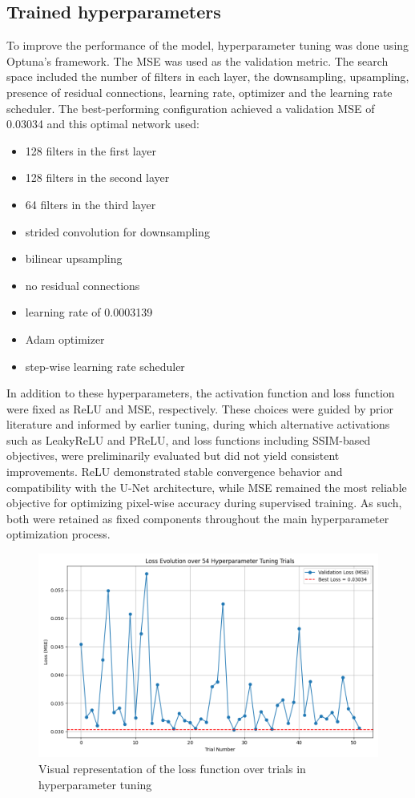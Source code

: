 \documentclass[twocolumn]{article}
\begin{document}
\subsection{Trained hyperparameters}
To improve the performance of the model, hyperparameter tuning was done using Optuna's framework. 
The MSE was used as the validation metric. The search space included the number of filters in each layer, the downsampling, upsampling, presence of residual connections, learning rate, optimizer and the learning rate scheduler. 
The best-performing configuration achieved a validation MSE of 0.03034 and this optimal network used: 
\begin{itemize}
    \item 128 filters in the first layer
    \item 128 filters in the second layer
    \item 64 filters in the third layer
    \item strided convolution for downsampling
    \item bilinear upsampling
    \item no residual connections
    \item learning rate of 0.0003139
    \item Adam optimizer 
    \item step-wise learning rate scheduler
\end{itemize}
In addition to these hyperparameters, the activation function and loss function were fixed as ReLU and MSE, respectively. 
These choices were guided by prior literature and informed by earlier tuning, during which alternative activations such as LeakyReLU and PReLU, and loss functions including SSIM-based objectives, were preliminarily evaluated but did not yield consistent improvements. 
ReLU demonstrated stable convergence behavior and compatibility with the U-Net architecture, while MSE remained the most reliable objective for optimizing pixel-wise accuracy during supervised training.
As such, both were retained as fixed components throughout the main hyperparameter optimization process. 

\begin{figure}[H]
    \centering
    \includegraphics[width=1\linewidth]{loss_hyperparameters.png}
    \caption{Visual representation of the loss function over trials in hyperparameter tuning}
    \label{fig:loss_hyperparameter}
\end{figure}
\end{document}
